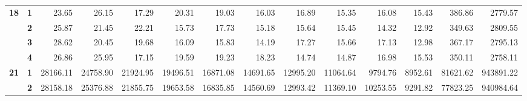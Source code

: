 \begin{table}[h!]
{\begin{tabular}{@{} ccrrrrrrrrrrrr}
\textbf{18} & \textbf{1}                     & 23.65                            & 26.15                            & 17.29                            & 20.31                            & 19.03                            & 16.03                            & 16.89                            & 15.35                            & 16.08                            & 15.43                            & 386.86                          & 2779.57                            \\
\textbf{}   & \textbf{2}                     & 25.87                            & 21.45                            & 22.21                            & 15.73                            & 17.73                            & 15.18                            & 15.64                            & 15.45                            & 14.32                            & 12.92                            & 349.63                          & 2809.55                            \\
\textbf{}   & \textbf{3}                     & 28.62                            & 20.45                            & 19.68                            & 16.09                            & 15.83                            & 14.19                            & 17.27                            & 15.66                            & 17.13                            & 12.98                            & 367.17                          & 2795.13                            \\
\textbf{}   & \textbf{4}                     & 26.86                            & 25.95                            & 17.15                            & 19.59                            & 19.23                            & 18.23                            & 14.74                            & 14.87                            & 16.98                            & 15.53                            & 350.11                          & 2758.11                            \\
\textbf{21} & \textbf{1}                     & 28166.11                         & 24758.90                         & 21924.95                         & 19496.51                         & 16871.08                         & 14691.65                         & 12995.20                         & 11064.64                         & 9794.76                          & 8952.61                          & 81621.62                        & 943891.22                          \\
\textbf{}   & \textbf{2}                     & 28158.18                         & 25376.88                         & 21855.75                         & 19653.58                         & 16835.85                         & 14560.69                         & 12993.42                         & 11369.10                         & 10253.55                         & 9291.82                          & 77823.25                        & 940984.64                          \\

\end{tabular}}
\end{table}
